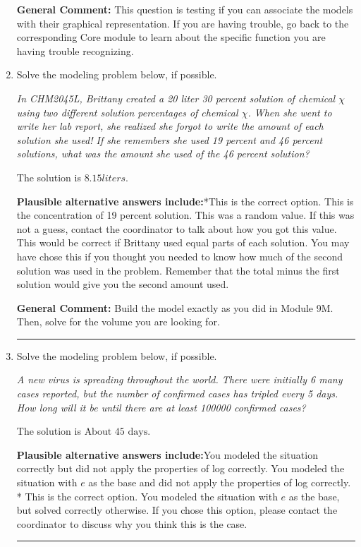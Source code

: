 \documentclass{extbook}[14pt]
\newcommand{\litem}[1]{\item #1

\rule{\textwidth}{0.4pt}}
\begin{document}
\begin{enumerate}
{\textbf{General Comment:} This question is testing if you can associate the models with their graphical representation. If you are having trouble, go back to the corresponding Core module to learn about the specific function you are having trouble recognizing.
}
\litem{
Solve the modeling problem below, if possible.

\begin{center}
    \textit{ In CHM2045L, Brittany created a 20 liter 30 percent solution of chemical $\chi$ using two different solution percentages of chemical $\chi$. When she went to write her lab report, she realized she forgot to write the amount of each solution she used! If she remembers she used 19 percent and 46 percent solutions, what was the amount she used of the 46 percent solution? }
\end{center}
The solution is \( 8.15 liters \).\begin{enumerate}[label=\Alph*.]
\textbf{Plausible alternative answers include:}*This is the correct option.
This is the concentration of 19 percent solution.
This was a random value. If this was not a guess, contact the coordinator to talk about how you got this value.
This would be correct if Brittany used equal parts of each solution.
You may have chose this if you thought you needed to know how much of the second solution was used in the problem. Remember that the total minus the first solution would give you the second amount used.
\end{enumerate}

\textbf{General Comment:} Build the model exactly as you did in Module 9M. Then, solve for the volume you are looking for.
}
\litem{
Solve the modeling problem below, if possible.

\begin{center}
    \textit{ A new virus is spreading throughout the world. There were initially 6 many cases reported, but the number of confirmed cases has tripled every 5 days. How long will it be until there are at least 100000 confirmed cases? }
\end{center}
The solution is \( \text{About } 45 \text{ days} \).\begin{enumerate}[label=\Alph*.]
\textbf{Plausible alternative answers include:}You modeled the situation correctly but did not apply the properties of log correctly.
You modeled the situation with $e$ as the base and did not apply the properties of log correctly.
* This is the correct option.
You modeled the situation with $e$ as the base, but solved correctly otherwise.
If you chose this option, please contact the coordinator to discuss why you think this is the case.
\end{enumerate}

}
\end{enumerate}
\end{document}

